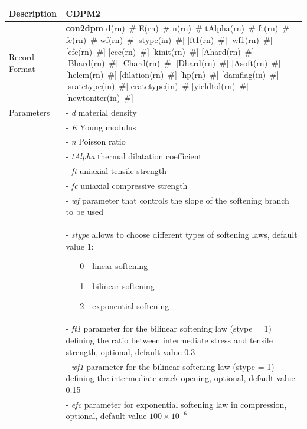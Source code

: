 \documentclass[a4paper]{article}
\newcommand{\descitem}[1]{{\noindent \bf #1}}
\newcommand{\elemparam}[2]{{{#1\tiny (#2)}~\#}}
\newcommand{\param}[1]{{\it #1}}
\newenvironment{mmt}{\begin{tabular}{|l|p{9cm}|}}{\end{tabular}\\}
\newenvironment{mmt}{\begin{tabular}{|l|l|}}{\end{tabular}\\}
\begin{document}
\begin{longtable}{|l|p{9cm}|}
\hline
Description & CDPM2\\
\hline
Record Format & \descitem{con2dpm}  \elemparam{d}{rn} \elemparam{E}{rn} \elemparam{n}{rn} \elemparam{tAlpha}{rn} \elemparam{ft}{rn} \elemparam{fc}{rn} \elemparam{wf}{rn} [\elemparam{stype}{in}] [\elemparam{ft1}{rn}] [\elemparam{wf1}{rn}] [\elemparam{efc}{rn}] [\elemparam{ecc}{rn}] [\elemparam{kinit}{rn}] [\elemparam{Ahard}{rn}] [\elemparam{Bhard}{rn}] [\elemparam{Chard}{rn}] [\elemparam{Dhard}{rn}] [\elemparam{Asoft}{rn}] [\elemparam{helem}{rn}] [\elemparam{dilation}{rn}] [\elemparam{hp}{rn}] [\elemparam{damflag}{in}] [\elemparam{sratetype}{in}] \elemparam{eratetype}{in} [\elemparam{yieldtol}{rn}] [\elemparam{newtoniter}{in}] \\
Parameters &- \param{d} material density\\
&- \param{E} Young modulus\\
&- \param{n} Poisson ratio\\
&- \param{tAlpha} thermal dilatation coefficient\\
&- \param{ft} uniaxial tensile strength\\
&- \param{fc} uniaxial compressive strength\\
&- \param{wf} parameter that controls the slope of the softening branch to be used\\
&- \param{stype} allows to choose different types of softening laws, default value 1:
\begin{itemize}\setlength{\itemsep}{-3pt}
\item[0 -] linear softening 
\item[1 -] bilinear softening
\item[2 -] exponential softening
\end{itemize}\\
&- \param{ft1}  parameter for the bilinear softening law (stype = 1) defining the ratio between intermediate stress and tensile strength, optional, default value 0.3\\
&- \param{wf1}  parameter for the bilinear softening law (stype = 1) defining the intermediate crack opening, optional, default value 0.15\\
&- \param{efc}  parameter for exponential softening law in compression, optional, default value $100 \times 10^{-6}$\\

\end{longtable}
\end{document}
